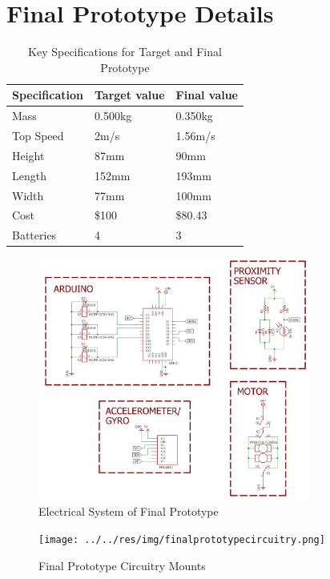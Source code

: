 \documentclass[class=../../report, crop=false]{standalone}
\begin{document}
\section{Final Prototype Details} \label{app:finaldetails}

\begin{table}[H]
	\centering
	\begin{tabular}{l | l | l}
		Specification & Target value & Final value \\ \hline
		Mass & 0.500kg & 0.350kg \\
		Top Speed & 2m/s & 1.56m/s \\
		Height & 87mm & 90mm \\
		Length & 152mm & 193mm \\
		Width & 77mm & 100mm \\
		Cost & \$100 & \$80.43 \\
		Batteries & 4 & 3 \\
	\end{tabular}
	\caption{Key Specifications for Target and Final Prototype}
	\label{app/table:targets}
\end{table}

\begin{figure}[H]
	\centering
	\includegraphics[width=0.8\textwidth]{../../res/img/circuit}
	\caption{Electrical System of Final Prototype}
	\label{app/fig:circuit}
\end{figure}

\begin{figure}[H]
	\centering
	\texttt{[image: ../../res/img/finalprototypecircuitry.png]}
	\caption{Final Prototype Circuitry Mounts}
	\label{app/fig:finalprototypecircuitry}
\end{figure}
\end{document}
